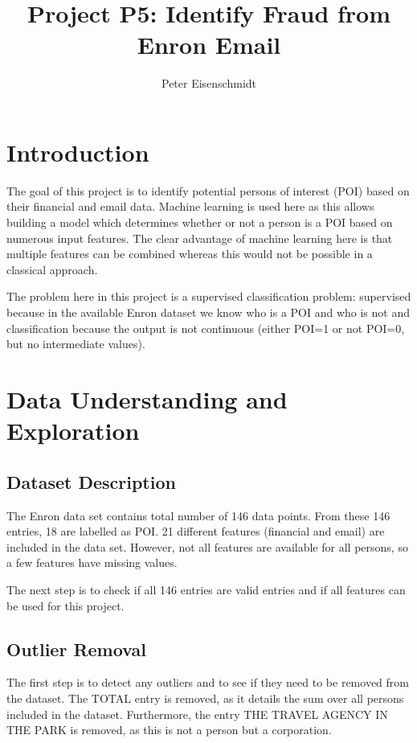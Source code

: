 \documentclass[11pt]{article} %
\title{Project P5: Identify Fraud from Enron Email}
\author{Peter Eisenschmidt}
\begin{document}
\maketitle

\section{Introduction}

The goal of this project is to identify potential persons of interest (POI) based on their financial and email data. Machine learning is used here as this allows building a model which determines whether or not a person is a POI based on numerous input features. The clear advantage of machine learning here is that multiple features can be combined whereas this would not be possible in a classical approach.\medskip

The problem here in this project is a supervised classification problem: supervised because in the available Enron dataset we know who is a POI and who is not and classification because the output is not continuous (either POI=1 or not POI=0, but no intermediate values).

\section{Data Understanding and Exploration}

\subsection{Dataset Description}

The Enron data set contains total number of 146 data points. From these 146 entries, 18 are labelled as POI. 21 different features (financial and email) are included in the data set. However, not all features are available for all persons, so a few features have missing values.\medskip

The next step is to check if all 146 entries are valid entries and if all features can be used for this project.

\subsection{Outlier Removal}

The first step is to detect any outliers and to see if they need to be removed from the dataset. The TOTAL entry is removed, as it details the sum over all persons included in the dataset.  Furthermore, the entry THE TRAVEL AGENCY IN THE PARK is removed, as this is not a person but a corporation. \medskip
\end{document}
